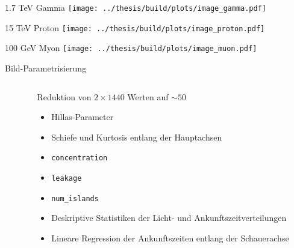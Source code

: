 \documentclass[aspectratio=1610, 9pt]{beamer}
\begin{document}



\begin{frame}[c]{1.7 TeV Gamma}
  \texttt{[image: ../thesis/build/plots/image\_gamma.pdf]}
\end{frame}

\begin{frame}[c]{15 TeV Proton}
  \texttt{[image: ../thesis/build/plots/image\_proton.pdf]}
\end{frame}

\begin{frame}[c]{100 GeV Myon}
  \texttt{[image: ../thesis/build/plots/image\_muon.pdf]}
\end{frame}

\begin{frame}[c]{Bild-Parametrisierung}
  \begin{columns}[onlytextwidth, c]
    \begin{column}{0.475\textwidth}%
      \parbox[c][0.9\textheight]{\linewidth}{%
      }%
    \end{column}%
    \begin{column}{0.475\textwidth}
      Reduktion von $2 \times 1440$ Werten auf $\sim 50$
      \begin{itemize}
        \item Hillas-Parameter
        \item Schiefe und Kurtosis entlang der Hauptachsen
        \item \texttt{concentration}
        \item \texttt{leakage}
        \item \texttt{num\_islands}
        \item Deskriptive Statistiken der Licht- und Ankunftszeitverteilungen
        \item Lineare Regression der Ankunftszeiten entlang der Schauerachse
      \end{itemize}
    \end{column}
  \end{columns}
\end{frame}
\end{document}
